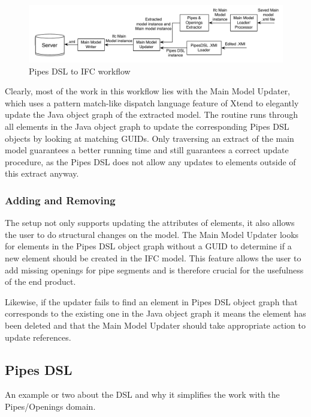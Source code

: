 \begin{figure}[htbp]
    \centering
        \includegraphics[width=120mm]{images/Pipes2IFC.pdf}
    \caption{Pipes DSL to IFC workflow}
    \label{fig:Pipes2IFCWorkflow}
\end{figure}

Clearly, most of the work in this workflow lies with the Main Model Updater, which uses a pattern match-like dispatch language feature of Xtend to elegantly update the Java object graph of the extracted model. The routine runs through all elements in the Java object graph to update the corresponding Pipes DSL objects by looking at matching GUIDs. Only traversing an extract of the main model guarantees a better running time and still guarantees a correct update procedure, as the Pipes DSL does not allow any updates to elements outside of this extract anyway.
\subsubsection{Adding and Removing}
The setup not only supports updating the attributes of elements, it also allows the user to do structural changes on the model. The Main Model Updater looks for elements in the Pipes DSL object graph without a GUID to determine if a new element should be created in the IFC model. This feature allows the user to add missing openings for pipe segments and is therefore crucial for the usefulness of the end product. 

Likewise, if the updater fails to find an element in Pipes DSL object graph that corresponds to the existing one in the Java object graph it means the element has been deleted and that the Main Model Updater should take appropriate action to update references.

\subsection{Pipes DSL}
An example or two about the DSL and why it simplifies the work with the Pipes/Openings domain.













